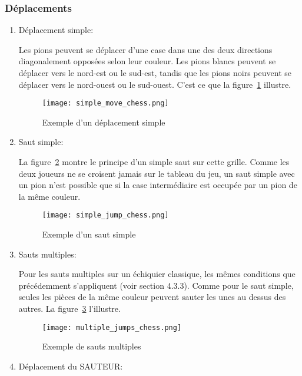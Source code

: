 \documentclass[11pt]{article}
\begin{document}
            \subsubsection{Déplacements}
                \begin{enumerate}
                    \item Déplacement simple:
                    
                    Les pions peuvent se déplacer d'une case dans une des deux directions diagonalement opposées selon leur couleur. Les pions blancs peuvent se déplacer vers le nord-est ou le sud-est, tandis que les pions noirs peuvent se déplacer vers le nord-ouest ou le sud-ouest. C'est ce que la figure~\ref{figure32} illustre.
                    \begin{figure}[h]
                                \centering
                                \texttt{[image: simple\_move\_chess.png]}
                                \caption{ Exemple d'un déplacement simple}
                                \label{figure32}
                                \end{figure}

                    \item Saut simple:
                    
                    La figure~\ref{figure33} montre le principe d'un simple saut sur cette grille. Comme les deux joueurs ne se croisent jamais sur le tableau du jeu, un saut simple avec un pion n'est possible que si la case intermédiaire est occupée par un pion de la même couleur.
                    \begin{figure}[h]
                                \centering
                                \texttt{[image: simple\_jump\_chess.png]}
                                \caption{ Exemple d'un saut simple}
                                \label{figure33}
                                \end{figure}
                    \item Sauts multiples:
                    
                    Pour les sauts multiples sur un échiquier classique, les mêmes conditions que précédemment s'appliquent (voir section 4.3.3). Comme pour le saut simple, seules les pièces de la même couleur peuvent sauter les unes au dessus des autres. La figure~\ref{figure34} l'illustre.
                        \begin{figure}[h]
                                \centering
                                \texttt{[image: multiple\_jumps\_chess.png]}
                                \caption{ Exemple de sauts multiples}
                                \label{figure34}
                                \end{figure}
                                \newpage
                    \item Déplacement du SAUTEUR:
                    

\end{enumerate}
\end{document}
